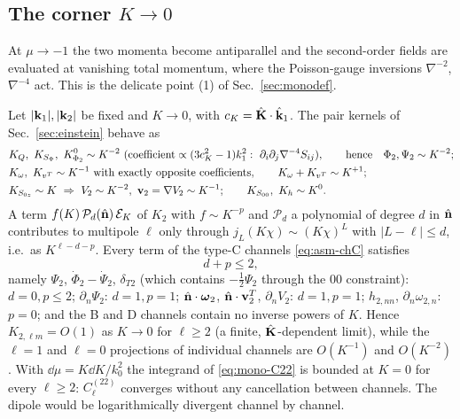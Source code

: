 \subsection{The corner \texorpdfstring{$K\to0$}{K->0}}
\label{sec:mono-K0}
At $\mu\to-1$ the two momenta become antiparallel and the second-order fields are evaluated at vanishing total momentum, where the
Poisson-gauge inversions $\nabla^{-2}$, $\nabla^{-4}$ act.  This is the delicate point (1) of Sec.~\ref{sec:monodef}.
\begin{proposition}[behaviour at $K\to0$]\label{prop:mono-K0}
Let $|\mathbf k_1|,|\mathbf k_2|$ be fixed and $K\to0$, with $c_K=\hat{\mathbf K}\cdot\hat{\mathbf k}_1$.  The pair kernels of Sec.~\ref{sec:einstein} behave as
\begin{align}
&K_Q,\ K_{S_\Phi},\ K^0_{\Phi_2}\sim K^{-2}\ (\text{coefficient}\propto(3c_K^2-1)k_1^2:\ \partial_i\partial_j\nabla^{-4}S_{ij}),\qquad\text{hence}\quad \Phi_2,\Psi_2\sim K^{-2};\nonumber\\
&K_\omega,\ K_{v^T}\sim K^{-1}\ \text{with exactly opposite coefficients},\qquad K_\omega+K_{v^T}\sim K^{+1};\nonumber\\
&K_{S_{0z}}\sim K\ \Rightarrow\ V_2\sim K^{-2},\ \vv_2=\nabla V_2\sim K^{-1};\qquad K_{S_{00}},\ K_h\sim K^0 .
\label{eq:mono-K0}
\end{align}
A term $f(K)\,\mathcal P_d(\hat{\mathbf n})\,\mathcal E_K$ of $K_2$ with $f\sim K^{-p}$ and $\mathcal P_d$ a polynomial of degree $d$ in $\hat{\mathbf n}$ contributes to
multipole $\ell$ only through $j_L(K\chi)\sim(K\chi)^L$ with $|L-\ell|\le d$, i.e.\ as $K^{\ell-d-p}$.  Every term of the type-C channels
\eqref{eq:asm-chC} satisfies
\begin{equation}
d+p\le2,
\label{eq:mono-count}
\end{equation}
namely $\Psi_2$, $\dot\Phi_2-\dot\Psi_2$, $\delta_{T2}$ (which contains $-\tfrac12\Psi_2$ through the $00$ constraint): $d=0,p\le2$; $\partial_n\Psi_2$: $d=1,p=1$; $\hat{\mathbf n}\cdot\boldsymbol\omega_2$, $\hat{\mathbf n}\cdot\mathbf v^T_2$, $\partial_nV_2$: $d=1,p=1$; $h_{2,nn}$, $\partial_n\omega_{2,n}$: $p=0$;
and the B and D channels contain no inverse powers of $K$.  Hence $K_{2,\ell m}=O(1)$ as $K\to0$ for $\ell\ge2$ (a finite,
$\hat{\mathbf K}$-dependent limit), while the $\ell=1$ and $\ell=0$ projections of individual channels are $O(K^{-1})$ and $O(K^{-2})$.
With $\dd\mu=K\dd K/k_0^2$ the integrand of \eqref{eq:mono-C22} is bounded at $K=0$ for every $\ell\ge2$: $C^{(22)}_\ell$ converges
without any cancellation between channels.  The dipole would be logarithmically divergent channel by channel.
\end{proposition}
